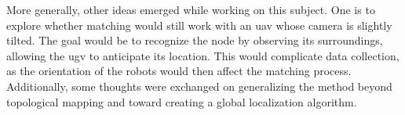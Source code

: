 More generally, other ideas emerged while working on this subject.
One is to explore whether matching would still work with an \gls{uav} whose camera is slightly tilted.
The goal would be to recognize the node by observing its surroundings, allowing the \gls{ugv} to anticipate its location.
This would complicate data collection, as the orientation of the robots would then affect the matching process.
Additionally, some thoughts were exchanged on generalizing the method beyond topological mapping and toward creating a global localization algorithm.



